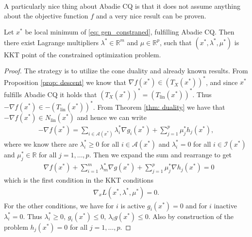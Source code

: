 A particularly nice thing about Abadie CQ is that it does not assume anything
about the objective function $f$ and a very nice result can be proven.
\begin{theorem}
    Let $x^{*}$ be local minimum of \ref{eq: gen_constraned}, fulfilling
    Abadie CQ. Then there exist Lagrange multipliers $\lambda^{*} \in
    \mathbb{R}^{m} $ and $\mu \in \mathbb{R}^{p}$, such that $(x^{*},
    \lambda^{*},\mu^{*})$ is KKT point of the constrained optimization
    problem.
\end{theorem}
\begin{proof}
   The strategy is to utilize the cone duality and already known results.
   From Proposition \ref{prop: descent} we know that $\nabla f(x^{*}) \in
   (T_X(x^{*}))^{*} $, and since $x^{*}$ fulfills Abadie CQ it holds that
   $(T_X(x^{*}))^{*}  = (T_{\text{lin}}(x^{*}))^{*}$. Thus $-\nabla f(x^{*})
   \in -(T_{\text{lin}}(x^{*}))^{*}$. From Theorem \ref{thm: duality} we have
   that $-\nabla f(x^{*}) \in N_{\text{lin} }(x^{*})$ and hence we can write
   \begin{align}
       -\nabla f(x^{*}) = \sum_{i \in \mathcal{A}(x^{*}) } \lambda_i^{*}  \nabla g_i(x^{*}) +
    \sum_{j=1}^{p} \mu_j^{*}h_j(x^{*}),
   \end{align}
   where we know there are $\lambda^{*}_i \ge 0$ for all $i \in
   \mathcal{A}(x^{*})$ and $\lambda^{*}_i = 0$ for all $i \in
   \mathcal{I}(x^{*})$ and $\mu^{*}_j \in \mathbb{R}$ for all $j=1,\ldots,p$.
   Then we expand the sum and rearrange to get
   \begin{align}
       &\nabla f(x^{*}) + \sum_{i=1}^{m} \lambda^{*}_m\nabla g(x^{*})
    + \sum_{j=1}^{p} \mu^{*}_j \nabla h_j(x^{*}) = 0
   \end{align}
   which is the first condition in the KKT conditions
   \begin{align}
       \nabla_x L(x^{*}, \lambda^{*}, \mu^{*}) = 0.
   \end{align}
   For the other conditions, we have for $i$ is active $g_i(x^{*}) = 0$ and
   for $i$ inactive $\lambda_i^{*}=0$. Thus $\lambda^{*}_i \ge 0$,
   $g_i(x^{*})\le 0$,  $\lambda_i g(x^{*}) \le 0$. Also by construction of
   the problem $h_j(x^{*})=0$ for all $j=1,\ldots,p$.
\end{proof}
